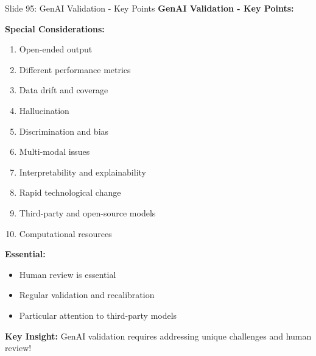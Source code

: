 \documentclass[8pt]{beamer}
\begin{document}
	\begin{frame}{Slide 95: GenAI Validation - Key Points}
		\fontsize{6.5}{7.5}\selectfont
		\textbf{GenAI Validation - Key Points:}
		
		\vspace{0.1cm}
		\textbf{Special Considerations:}
		\begin{enumerate}
			\item Open-ended output
			\item Different performance metrics
			\item Data drift and coverage
			\item Hallucination
			\item Discrimination and bias
			\item Multi-modal issues
			\item Interpretability and explainability
			\item Rapid technological change
			\item Third-party and open-source models
			\item Computational resources
		\end{enumerate}
		
		\vspace{0.1cm}
		\textbf{Essential:}
		\begin{itemize}
			\item Human review is essential
			\item Regular validation and recalibration
			\item Particular attention to third-party models
		\end{itemize}
		
		\textcolor{myblue}{\textbf{Key Insight:}} GenAI validation requires \textcolor{myblue}{addressing unique challenges and human review}!
	\end{frame}
	
\end{document}
